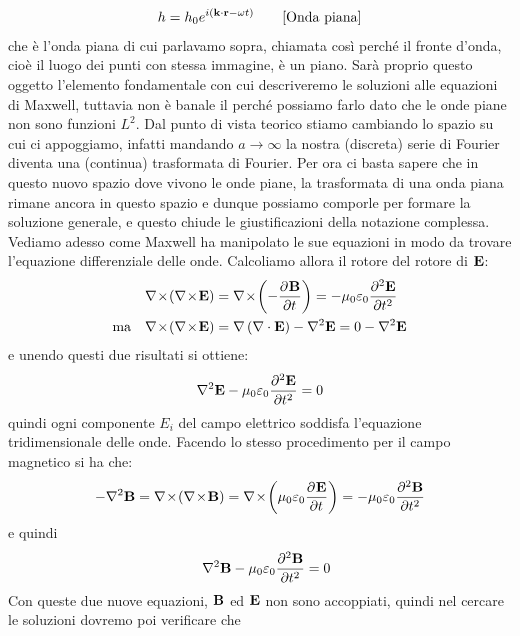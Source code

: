 \begin{align}
  h = h_0 e^{i (\v{k\cdot r} - \omega t)} \tag*{[Onda piana]}
\end{align} \label{eq: onda piana}
che è l'onda piana di cui parlavamo sopra, chiamata così perché il fronte d'onda, cioè il luogo dei punti con stessa immagine, è un piano. Sarà proprio 
questo oggetto l'elemento fondamentale con cui descriveremo le soluzioni alle equazioni di Maxwell, tuttavia non è banale il perché possiamo farlo dato che 
le onde piane non sono funzioni $ L^2 $. Dal punto di vista teorico stiamo cambiando lo spazio su cui ci appoggiamo, infatti mandando $ a \to \infty $ la 
nostra (discreta) serie di Fourier diventa una (continua) trasformata di Fourier. Per ora ci basta sapere che in questo nuovo spazio dove vivono le onde 
piane, la trasformata di una onda piana rimane ancora in questo spazio e dunque possiamo comporle per formare la soluzione generale, e questo chiude le 
giustificazioni della notazione complessa. 
Vediamo adesso come Maxwell ha manipolato le sue equazioni in modo da trovare l'equazione differenziale delle onde. Calcoliamo allora il rotore del 
rotore di $ \v{ E } $:
\begin{align}
  \v{\nabla}\!\times\! \left( \v{\nabla}\!\times\!\v{ E } \right) &= \v{\nabla}\!\times\! \left( - \der{\v{ B }}{t} \right)
  = - \mu_0 \varepsilon_0 \der[2]{\v{ E }}{t}
  \\
  \text{ma} \quad \v{\nabla}\!\times\! \left( \v{\nabla}\!\times\!\v{ E } \right) 
  &= \nabla \left( \nabla \cdot \v{ E } \right) - \nabla^2 \v{ E } = 0 - \nabla ^2 \v{ E }
\end{align}
e unendo questi due risultati si ottiene:
\begin{equation}
  \nabla^2\v{ E } -\mu_0 \varepsilon_0 \der[2]{\v{ E }}{t} = 0
\end{equation}
quindi ogni componente $ E_i $ del campo elettrico soddisfa l'equazione tridimensionale delle onde. Facendo lo stesso procedimento per il campo 
magnetico si ha che:
\begin{align}
  -\nabla^2 \v{ B } = \nabla\!\times\!\left( \nabla\!\times\!\v{ B } \right) 
  = \nabla \! \times \! \left( \mu_0 \varepsilon_0 \der{\v{ E }}{t} \right) = - \mu_0 \varepsilon_0 \der[2]{\v{ B }}{t}
\end{align}
e quindi
\begin{equation}
  \quad \nabla^2\v{ B } - \mu_0 \varepsilon_0 \der[2]{\v{ B }}{t} = 0
\end{equation}
Con queste due nuove equazioni, $ \v{ B } $ ed $ \v{ E } $ non sono accoppiati, quindi nel cercare le soluzioni dovremo poi verificare che 
